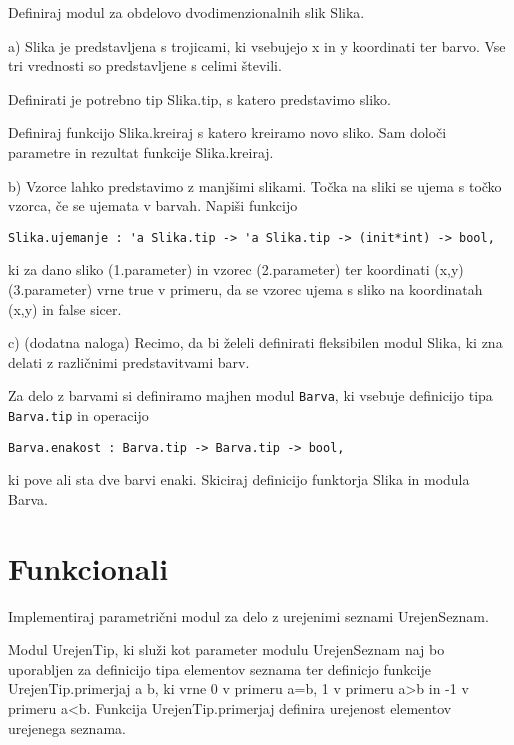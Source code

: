 \begin{ex}
Definiraj modul za obdelovo dvodimenzionalnih slik Slika. 

a) Slika je predstavljena s trojicami, ki vsebujejo x in y koordinati ter barvo. Vse tri vrednosti so predstavljene s celimi \v stevili.   

Definirati je potrebno tip Slika.tip, s katero predstavimo sliko.

Definiraj funkcijo Slika.kreiraj s katero kreiramo novo sliko. Sam dolo\v ci parametre in rezultat funkcije Slika.kreiraj. 

b) Vzorce lahko predstavimo z manj\v simi slikami. To\v cka na sliki se ujema s to\v cko vzorca, \v ce se ujemata v barvah. Napi\v si funkcijo 
\begin{lstlisting}
Slika.ujemanje : 'a Slika.tip -> 'a Slika.tip -> (init*int) -> bool, 
\end{lstlisting}

ki za dano sliko (1.parameter) in vzorec (2.parameter) ter koordinati (x,y) (3.parameter) vrne true v primeru, da se vzorec ujema s sliko na koordinatah (x,y) in false sicer.

c) (dodatna naloga) Recimo, da bi \v zeleli definirati fleksibilen modul Slika, ki zna delati z razli\v cnimi predstavitvami barv. 

Za delo z barvami si definiramo majhen modul \lstinline{Barva}, ki vsebuje definicijo tipa \lstinline{Barva.tip} in operacijo 
\begin{lstlisting}
Barva.enakost : Barva.tip -> Barva.tip -> bool, 
\end{lstlisting}
ki pove ali sta dve barvi enaki. 
Skiciraj definicijo funktorja Slika in modula Barva.

\section{Funkcionali}


\end{ex}
\begin{ex}
Implementiraj parametri\v cni modul za delo z urejenimi seznami UrejenSeznam. 

Modul UrejenTip, ki slu\v zi kot parameter modulu UrejenSeznam naj bo uporabljen za definicijo tipa elementov seznama ter definicjo funkcije UrejenTip.primerjaj a b, ki vrne 0 v primeru a=b, 1 v primeru a>b in -1 v primeru a<b. Funkcija UrejenTip.primerjaj definira urejenost elementov urejenega seznama.
\end{ex}

